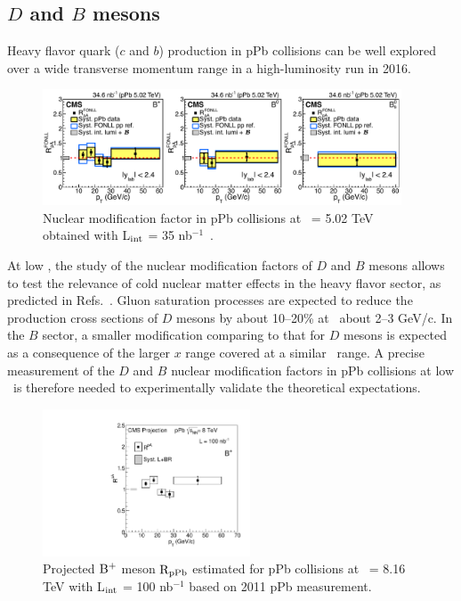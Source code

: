 \subsection{$D$ and $B$ mesons}

Heavy flavor quark ($c$ and $b$) production in pPb collisions
can be well explored over a wide transverse momentum range
in a high-luminosity run in 2016. 


\begin{figure}[h]
\begin{center}
\includegraphics[width= 0.95\textwidth]{figures/nuclearmodification.pdf}
\caption{Nuclear modification factor in pPb collisions at \rootsNN\ = 5.02 TeV 
obtained with L$_{\rm int}$ = 35 nb$^{-1}$~\cite{PhysRevLett.116.032301}.}
\label{fig:measurementB}
\end{center}
\end{figure}


At low \pt, the study of the nuclear modification factors of
$D$ and $B$ mesons allows to test the relevance of cold nuclear matter 
effects in the heavy flavor sector, 
as predicted in Refs.~\cite{Eskola:2009uj,deFlorian:2003qf,Frankfurt:2011cs}. 
Gluon saturation processes are expected to reduce the production 
cross sections of $D$ mesons by about 10--20\% at \pt\ about 2--3 GeV/c.  
In the $B$ sector, a smaller modification comparing to that for 
$D$ mesons is expected as a consequence of the larger $x$ range 
covered at a similar \pt\ range. A precise measurement of the $D$ and $B$ 
nuclear modification factors in pPb collisions at low \pt\ is therefore 
needed to experimentally validate the theoretical expectations. 


\begin{figure}[h]
\begin{center}
\includegraphics[width= 0.55\textwidth]{figures/canvasrpabplus}
\caption{Projected $\rm B^{+}$ meson $\rm R_{pPb}$ estimated for pPb collisions at \rootsNN\ = 8.16 TeV 
with L$_{\rm int}$ = 100 nb$^{-1}$ based on 2011 pPb measurement.}
\label{fig:Bextrapolated}
\end{center}
\end{figure}

